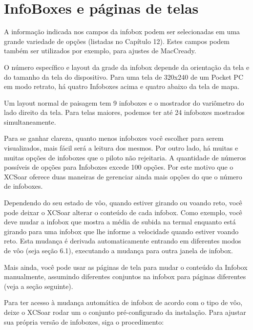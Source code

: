 \section{InfoBoxes e páginas de telas}\label{sec:infoboxandpages}

A informação indicada nos campos da infobox podem ser selecionadas em uma grande variedade de opções (listadas no Capítulo 12).  Estes campos podem também ser utilizados por exemplo, para ajustes de MacCready.

O número específico e layout da grade da infobox depende da orientação da tela e do tamanho da tela do dispositivo.
Para uma tela de 320x240 de um Pocket PC em modo retrato, há quatro Infoboxes acima e quatro abaixo da tela de mapa.

Um layout normal de paisagem tem 9 infoboxes e o mostrador do variômetro do lado direito da tela.  Para telas maiores, podemos ter até 24 infoboxes mostrados simultaneamente.

Para se ganhar clareza, quanto menos infoboxes você escolher para serem visualizados, mais fácil será a leitura dos mesmos.  Por outro lado, há muitas e muitas opções de infoboxes que o piloto não rejeitaria.  A quantidade de números possíveis de opções para Infoboxes excede 100 opções.  Por este motivo que o XCSoar oferece duas maneiras de gerenciar ainda mais opções do que o número de infoboxes.

Dependendo do seu estado de vôo, quando estiver girando ou voando reto, você pode deixar o XCSoar alterar o conteúdo de cada infobox.  Como exemplo, você deve mudar a infobox que mostra a média de subida na termal enquanto está girando para uma infobox que lhe informe a velocidade quando estiver voando reto.  Esta mudança é derivada automaticamente entrando em diferentes modos de vôo (seja seção 6.1), executando a mudança para outra janela de infobox.

Mais ainda, você pode usar as páginas de tela para mudar o conteúdo da Infobox manualmente, assumindo diferentes conjuntos na infobox para páginas diferentes (veja a seção seguinte).

Para ter acesso à mudança automática de infobox de acordo com o tipo de vôo, deixe o XCSoar rodar um o conjunto pré-configurado da instalação.  Para ajustar sua própria versão de infoboxes, siga o procedimento:


